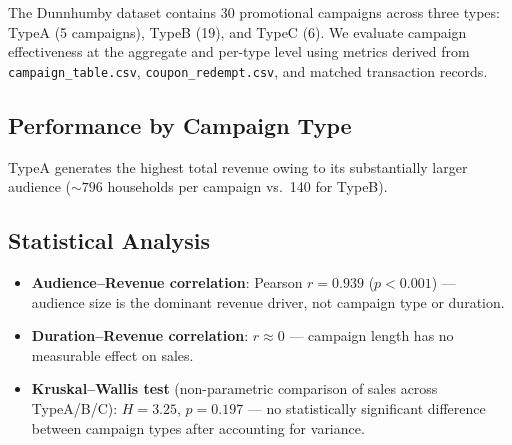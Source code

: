 \documentclass[conference]{IEEEtran}
\begin{document}
The Dunnhumby dataset contains 30 promotional campaigns across three
types: TypeA (5 campaigns), TypeB (19), and TypeC (6).  We evaluate
campaign effectiveness at the aggregate and per-type level using
metrics derived from \texttt{campaign\_table.csv},
\texttt{coupon\_redempt.csv}, and matched transaction records.

\subsection{Performance by Campaign Type}

\begin{table}[H]
\centering
\caption{Campaign performance summary by type (source: \texttt{campaign2\_analysis.py}).}
\label{tab:campaign}
\end{table}

TypeA generates the highest total revenue owing to its substantially
larger audience (${\sim}796$ households per campaign vs.\ 140 for
TypeB).

\subsection{Statistical Analysis}

\begin{itemize}
  \item \textbf{Audience--Revenue correlation}: Pearson $r = 0.939$
        ($p < 0.001$) --- audience size is the dominant revenue
        driver, not campaign type or duration.
  \item \textbf{Duration--Revenue correlation}: $r \approx 0$
        --- campaign length has no measurable effect on sales.
  \item \textbf{Kruskal--Wallis test} (non-parametric comparison of
        sales across TypeA/B/C): $H = 3.25$, $p = 0.197$ ---
        no statistically significant difference between campaign
        types after accounting for variance.
\end{itemize}
\end{document}
